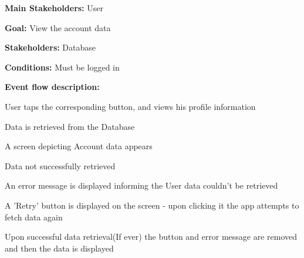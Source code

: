 				\noindent {}
				\begin{packed_item}
					\item \textbf{Main Stakeholders:} User
					\item \textbf{Goal:} View the account data
					\item \textbf{Stakeholders:} Database
					\item \textbf{Conditions:} Must be logged in
					\item \textbf{Event flow description: }
					\begin{packed_enum}
						\item User taps the corresponding button, and views his profile information
						\item Data is retrieved from the Database
						\item A screen depicting Account data appears
					\end{packed_enum}
					
					\begin{packed_item}
						\item[2.a] Data not successfully retrieved
						\item[] \begin{packed_enum}
							\item An error message is displayed informing the User data couldn't be retrieved
							\item A 'Retry' button is displayed on the screen - upon clicking it the app attempts to fetch data again
							\item Upon successful data retrieval(If ever) the button and error message are removed and then the data is displayed
						\end{packed_enum}
					\end{packed_item}
				\end{packed_item}
			
